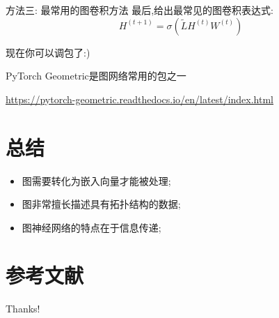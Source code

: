 \documentclass{beamer}
\begin{document}
\begin{frame}{方法三: 最常用的图卷积方法}
    最后,给出最常见的图卷积表达式:
    $$H^{(t+1)} = \sigma(\tilde{L}H^{(t)}W^{(t)})$$

    现在你可以调包了:)
    \newline

    PyTorch Geometric是图网络常用的包之一
    
    \url{https://pytorch-geometric.readthedocs.io/en/latest/index.html}
\end{frame}

\section{总结}

\begin{frame}
    \begin{itemize}
        \item 图需要转化为嵌入向量才能被处理;
        \item 图非常擅长描述具有拓扑结构的数据;
        \item 图神经网络的特点在于信息传递;
    \end{itemize}
\end{frame}

\section{参考文献}

\begin{frame} %
    
    
\end{frame}

\begin{frame}
    \begin{center}
        {\Huge\calligra Thanks!}
    \end{center}
\end{frame}
\end{document}
